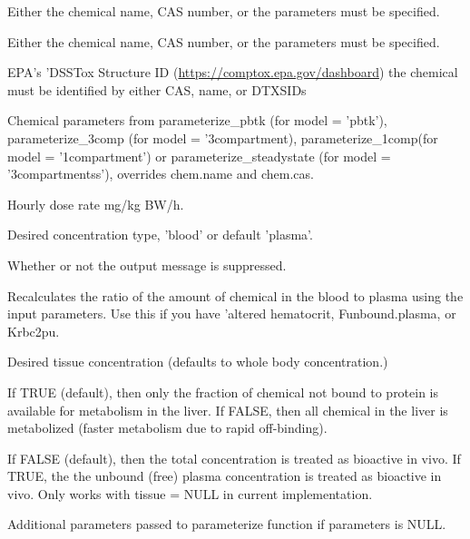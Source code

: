 \documentclass[a4paper]{book}
\begin{document}
\begin{Arguments}
\begin{ldescription}
\item[\code{chem.name}] Either the chemical name, CAS number, or the parameters must 
be specified.

\item[\code{chem.cas}] Either the chemical name, CAS number, or the parameters must 
be specified.

\item[\code{dtxsid}] EPA's 'DSSTox Structure ID (\url{https://comptox.epa.gov/dashboard})
the chemical must be identified by either CAS, name, or DTXSIDs

\item[\code{parameters}] Chemical parameters from parameterize\_pbtk (for model = 
'pbtk'), parameterize\_3comp (for model = '3compartment), 
parameterize\_1comp(for model = '1compartment') or parameterize\_steadystate 
(for model = '3compartmentss'), overrides chem.name and chem.cas.

\item[\code{hourly.dose}] Hourly dose rate mg/kg BW/h.

\item[\code{concentration}] Desired concentration type, 'blood' or default 'plasma'.

\item[\code{suppress.messages}] Whether or not the output message is suppressed.

\item[\code{recalc.blood2plasma}] Recalculates the ratio of the amount of chemical 
in the blood to plasma using the input parameters. Use this if you have 
'altered hematocrit, Funbound.plasma, or Krbc2pu.

\item[\code{tissue}] Desired tissue concentration (defaults to whole body 
concentration.)

\item[\code{restrictive.clearance}] If TRUE (default), then only the fraction of
chemical not bound to protein is available for metabolism in the liver. If 
FALSE, then all chemical in the liver is metabolized (faster metabolism due
to rapid off-binding).

\item[\code{bioactive.free.invivo}] If FALSE (default), then the total concentration is treated
as bioactive in vivo. If TRUE, the the unbound (free) plasma concentration is treated as 
bioactive in vivo. Only works with tissue = NULL in current implementation.

\item[\code{...}] Additional parameters passed to parameterize function if 
parameters is NULL.
\end{ldescription}
\end{Arguments}
\end{document}

